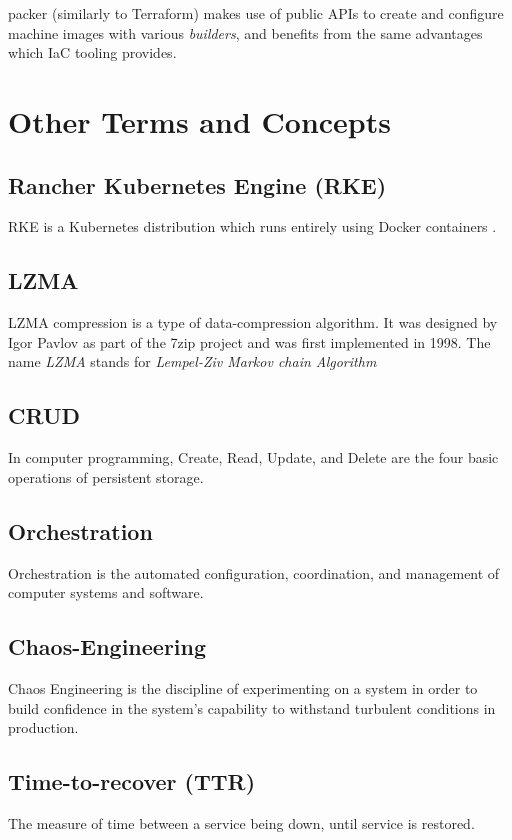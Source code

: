 packer (similarly to Terraform) makes use of public APIs to create and configure machine images with various \textit{builders}, and benefits from the same advantages which IaC tooling provides.


\section{Other Terms and Concepts}
\subsection*{Rancher Kubernetes Engine (RKE)}
RKE is a Kubernetes distribution which runs entirely using Docker containers \cite{rke}. 

\subsection*{LZMA}
LZMA compression is a type of data-compression algorithm.
It was designed by Igor Pavlov as part of the 7zip \cite{pavlov_2022} project and was first implemented in 1998.
The name \textit{LZMA} stands for \textit{Lempel-Ziv Markov chain Algorithm}\cite{winzip_2021}

\subsection*{CRUD}
In computer programming, Create, Read, Update, and Delete are the four basic operations of persistent storage\cite{martin1983managing}.

\subsection*{Orchestration}
Orchestration is the automated configuration, coordination, and management of computer systems and software\cite{erl1900service}.

\subsection*{Chaos-Engineering}
Chaos Engineering is the discipline of experimenting on a system in order to build confidence in the system's capability to withstand turbulent conditions in production\cite{hochstein_2019}.

\subsection*{Time-to-recover (TTR)}
The measure of time between a service being down, until service is restored.


